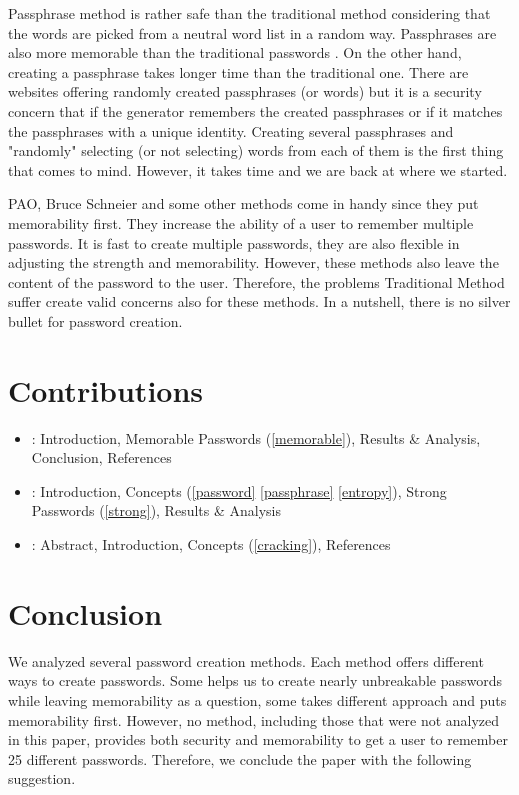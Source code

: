 \documentclass[acmsmall,nonacm]{acmart}
\begin{document}
Passphrase method is rather safe than the traditional method considering that the words are picked from a neutral word list in a random way. Passphrases are also more memorable than the traditional passwords \cite{fernandes_2021}. On the other hand, creating a passphrase takes longer time than the traditional one. There are websites offering randomly created passphrases (or words) but it is a security concern that if the generator remembers the created passphrases or if it matches the passphrases with a unique identity. Creating several passphrases and "randomly" selecting (or not selecting) words from each of them is the first thing that comes to mind. However, it takes time and we are back at where we started.

PAO, Bruce Schneier and some other methods come in handy since they put memorability first. They increase the ability of a user to remember multiple passwords. It is fast to create multiple passwords, they are also flexible in adjusting the strength and memorability. However, these methods also leave the content of the password to the user. Therefore, the problems Traditional Method suffer create valid concerns also for these methods. In a nutshell, there is no silver bullet for password creation.

\newpage

\section{Contributions}
\begin{itemize}
\item{: Introduction, Memorable Passwords (\ref{memorable}), Results \& Analysis, Conclusion, References}
\item{: Introduction, Concepts (\ref{password} \ref{passphrase}  \ref{entropy}), Strong Passwords (\ref{strong}), Results \& Analysis}
\item{: Abstract, Introduction, Concepts (\ref{cracking}),  References}
\end{itemize}

\section{Conclusion}

We analyzed several password creation methods. Each method offers different ways to create passwords. Some helps us to create nearly unbreakable passwords while leaving memorability as a question, some takes different approach and puts memorability first. However, no method, including those that were not analyzed in this paper, provides both security and memorability to get a user to remember 25 different passwords. Therefore, we conclude the paper with the following suggestion.
\end{document}

